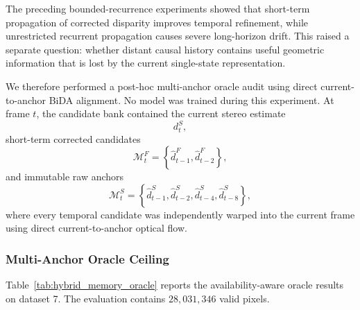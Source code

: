 \documentclass[11pt,a4paper]{article}
\begin{document}
The preceding bounded-recurrence experiments showed that short-term propagation of
corrected disparity improves temporal refinement, while unrestricted recurrent propagation
causes severe long-horizon drift. This raised a separate question: whether distant causal
history contains useful geometric information that is lost by the current single-state
representation.

We therefore performed a post-hoc multi-anchor oracle audit using direct current-to-anchor
BiDA alignment. No model was trained during this experiment. At frame \(t\), the candidate
bank contained the current stereo estimate
\begin{equation}
    d_t^{S},
\end{equation}
short-term corrected candidates
\begin{equation}
    \mathcal{M}^{F}_t
    =
    \left\{
        \hat d_{t-1}^{F},
        \hat d_{t-2}^{F}
    \right\},
\end{equation}
and immutable raw anchors
\begin{equation}
    \mathcal{M}^{S}_t
    =
    \left\{
        \hat d_{t-1}^{S},
        \hat d_{t-2}^{S},
        \hat d_{t-4}^{S},
        \hat d_{t-8}^{S}
    \right\},
\end{equation}
where every temporal candidate was independently warped into the current frame using
direct current-to-anchor optical flow.

\subsubsection{Multi-Anchor Oracle Ceiling}

Table~\ref{tab:hybrid_memory_oracle} reports the availability-aware oracle results on
dataset 7. The evaluation contains \(28{,}031{,}346\) valid pixels.
\end{document}
